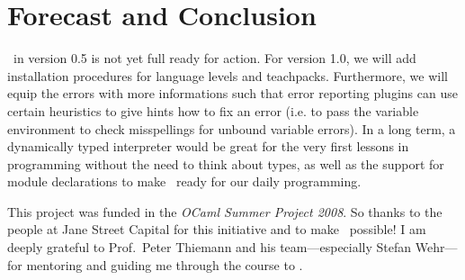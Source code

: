 
\section{Forecast and Conclusion}

\easyocaml\ in version 0.5 is not yet full ready for action. For version 
1.0, we will add installation procedures for language levels and 
teachpacks.
Furthermore, we will equip the errors with more informations 
such that error reporting plugins can use certain heuristics to give 
hints how to fix an error (i.e. to pass the variable environment to check
misspellings for unbound variable errors).
In a long term, a dynamically typed interpreter would be great for the very
first lessons in programming without the need to think about types, as well as
the support for module declarations to make \easyocaml\ ready for our daily
programming.


This project was funded in the \emph{OCaml Summer Project 2008}.
So thanks to the people at Jane Street Capital for this initiative and to
make \easyocaml\ possible!
I am deeply grateful to Prof.\ Peter Thiemann and his team---especially Stefan
Wehr---for mentoring and guiding me through the course to \easyocaml.

